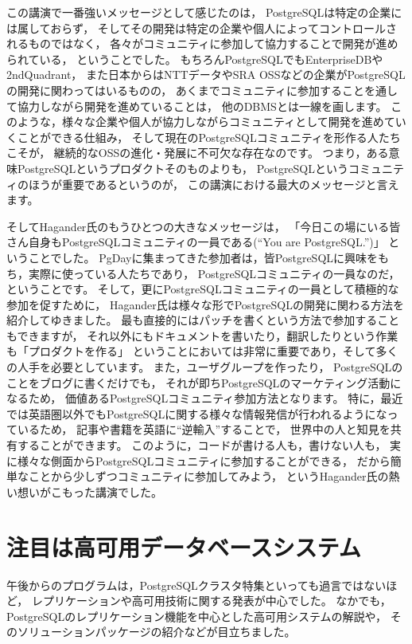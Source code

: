 この講演で一番強いメッセージとして感じたのは，
PostgreSQLは特定の企業には属しておらず，
そしてその開発は特定の企業や個人によってコントロールされるものではなく，
各々がコミュニティに参加して協力することで開発が進められている，
ということでした。
もちろんPostgreSQLでもEnterpriseDBや2ndQuadrant，
また日本からはNTTデータやSRA OSSなどの企業がPostgreSQLの開発に関わってはいるものの，
あくまでコミュニティに参加することを通して協力しながら開発を進めていることは，
他のDBMSとは一線を画します。
このような，様々な企業や個人が協力しながらコミュニティとして開発を進めていくことができる仕組み，
そして現在のPostgreSQLコミュニティを形作る人たちこそが，
継続的なOSSの進化・発展に不可欠な存在なのです。
つまり，ある意味PostgreSQLというプロダクトそのものよりも，
PostgreSQLというコミュニティのほうが重要であるというのが，
この講演における最大のメッセージと言えます。

そしてHagander氏のもうひとつの大きなメッセージは，
「今日この場にいる皆さん自身もPostgreSQLコミュニティの一員である(``You are PostgreSQL.'')」
ということでした。
PgDayに集まってきた参加者は，皆PostgreSQLに興味をもち，実際に使っている人たちであり，
PostgreSQLコミュニティの一員なのだ，ということです。
そして，更にPostgreSQLコミュニティの一員として積極的な参加を促すために，
Hagander氏は様々な形でPostgreSQLの開発に関わる方法を紹介してゆきました。
最も直接的にはパッチを書くという方法で参加することもできますが，
それ以外にもドキュメントを書いたり，翻訳したりという作業も「プロダクトを作る」
ということにおいては非常に重要であり，そして多くの人手を必要としています。
また，ユーザグループを作ったり，
PostgreSQLのことをブログに書くだけでも，
それが即ちPostgreSQLのマーケティング活動になるため，
価値あるPostgreSQLコミュニティ参加方法となります。
特に，最近では英語圏以外でもPostgreSQLに関する様々な情報発信が行われるようになっているため，
記事や書籍を英語に``逆輸入''することで，
世界中の人と知見を共有することができます。
このように，コードが書ける人も，書けない人も，
実に様々な側面からPostgreSQLコミュニティに参加することができる，
だから簡単なことから少しずつコミュニティに参加してみよう，
というHagander氏の熱い想いがこもった講演でした。

\section{注目は高可用データベースシステム}

午後からのプログラムは，PostgreSQLクラスタ特集といっても過言ではないほど，
レプリケーションや高可用技術に関する発表が中心でした。
なかでも，PostgreSQLのレプリケーション機能を中心とした高可用システムの解説や，
そのソリューションパッケージの紹介などが目立ちました。

